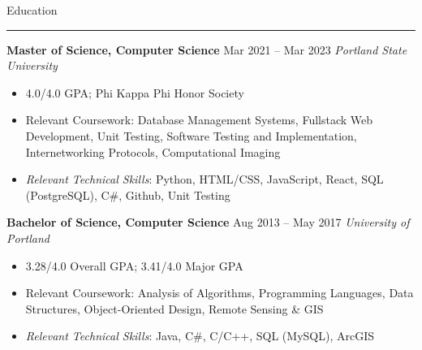 \documentclass[11pt]{article}
\def\langoop{Java, C\#}
\def\langcfam{C/C++}
\def\langweb{HTML/CSS}
\def\langjs{Javascript, React, jQuery}
\def\langsql{SQL (PostgreSQL, MySQL)}
\newcommand{\sectiontitle}[1]{
    \noindent\Large#1
    \newline
    \vspace{-0.18in}
    \hrule   
}
\newcommand{\school}[3]{
    \topitemspacing
    \normalsize\noindent\textbf{#1}
    \hfill
    \noindent#3
    \newline
    \noindent\textit{#2}
    \toplistspacing
}
\newcommand{\inlinelist}[2]{
    \topitemspacing
    \noindent\normalsize\textbf{#1}: #2
}
\newcommand{\sectionendspace}{
    \vspace{0.1in}
}
\newcommand{\toplistspacing}{
    \vspace{0.04in}
}
\newcommand{\topitemspacing}{
    \vspace{0.1in}
}
\begin{document}
    \sectiontitle{Education}
    \school{Master of Science, Computer Science}
    {Portland State University}
    {Mar 2021 -- Mar 2023}
    \begin{itemize}[noitemsep,nolistsep]
        \item 4.0/4.0 GPA; Phi Kappa Phi Honor Society
        \item Relevant Coursework: Database Management Systems, Fullstack Web Development, Unit Testing, Software Testing and Implementation, Internetworking Protocols, Computational Imaging
        \item \emph{Relevant Technical Skills}: Python, \langweb, JavaScript, React, SQL (PostgreSQL), C\#, Github, Unit Testing
    \end{itemize}
    \school{Bachelor of Science, Computer Science}
    {University of Portland}
    {Aug 2013 -- May 2017}
    \begin{itemize}[noitemsep,nolistsep]
        \item 3.28/4.0 Overall GPA; 3.41/4.0 Major GPA
        \item Relevant Coursework: Analysis of Algorithms, Programming Languages, Data Structures, Object-Oriented Design, Remote Sensing \& GIS
        \item \emph{Relevant Technical Skills}: \langoop, \langcfam, SQL (MySQL), ArcGIS
    \end{itemize}
    \sectionendspace
\end{document}
